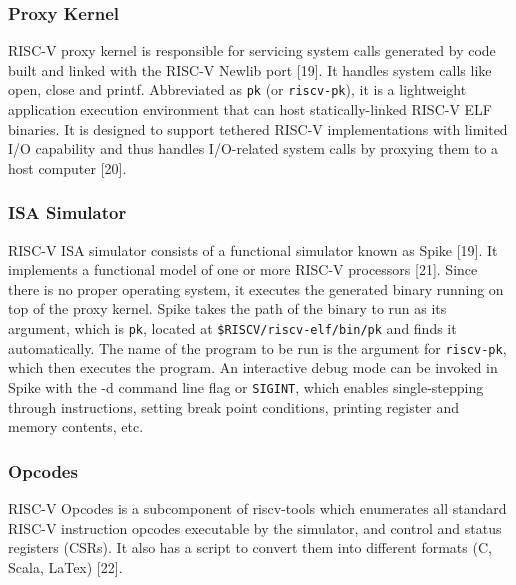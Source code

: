 \subsubsection{Proxy Kernel}
 \label{sect6_2_1_3}
RISC-V proxy kernel is responsible for servicing system calls generated by code built and linked with the RISC-V Newlib port [19]. It handles system calls like open, close and printf. Abbreviated as \verb|pk| (or \verb|riscv-pk|), it is a lightweight application execution environment that can host statically-linked RISC-V ELF binaries. It is designed to support tethered RISC-V implementations with limited I/O capability and thus handles I/O-related system calls by proxying them to a host computer [20].

\subsubsection{ISA Simulator}
 \label{sect6_2_1_4}
RISC-V ISA simulator consists of a functional simulator known as Spike [19]. It implements a functional model of one or more RISC-V processors [21]. Since there is no proper operating system, it executes the generated binary running on top of the proxy kernel. \newline\newline
Spike takes the path of the binary to run as its argument, which is \verb|pk|, located at \verb|$RISCV/riscv-elf/bin/pk| and finds it automatically. The name of the program to be run is the argument for \verb|riscv-pk|, which then executes the program. An interactive debug mode can be invoked in Spike with the -d command line flag or \verb|SIGINT|, which enables single-stepping through instructions, setting break point conditions, printing register and memory contents, etc.

\subsubsection{Opcodes}
 \label{sect6_2_1_5}
RISC-V Opcodes is a subcomponent of riscv-tools which enumerates all standard RISC-V instruction opcodes executable by the simulator, and control and status registers (CSRs). It also has a script to convert them into different formats (C, Scala, LaTex) [22].


